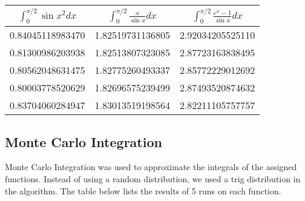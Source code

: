 \documentclass[a4paper12pt,titlepage]{article}
\begin{document}
        \begin{table}[h!]
          \begin{center}
            \label{tab:table1}
            \begin{tabular}{|c|c|c|}
              \toprule
              \large{\textbf{$\int_{0}^{\pi/2} \sin{x^2} dx$}} & \large{\textbf{$\int_{0}^{\pi/2} \frac{x}{\sin{x}} dx$}} & \large{\textbf{$\int_{0}^{\pi/2} \frac{e^x -1}{\sin{x}} dx$}}\\
              \hline
              \normalsize{0.84045118983470} &\normalsize{1.82519731136805} & \normalsize{2.92034205525110}\\
              \hline              
              \normalsize{0.81300986203938} &\normalsize{1.82513807323085} & \normalsize{2.87723163838495}\\
              \hline              
              \normalsize{0.80562048631475} &\normalsize{1.82775260493337} & \normalsize{2.85772229012692}\\
              \hline              
              \normalsize{0.80003778520629} &\normalsize{1.82696575239499} & \normalsize{2.87493520874632}\\
              \hline              
              \normalsize{0.83704060284947} &\normalsize{1.83013519198564} & \normalsize{2.82211105757757}\\
              \hline

            \end{tabular}
          \end{center}
        \end{table}
        
        \subsection{Monte Carlo Integration}
        \normalsize{
        Monte Carlo Integration was used to approximate the integrals of the assigned functions. Instead of using a random distribution, we used a trig distribution in the algorithm. The table below lists the results of 5 runs on each function. }
\end{document}
